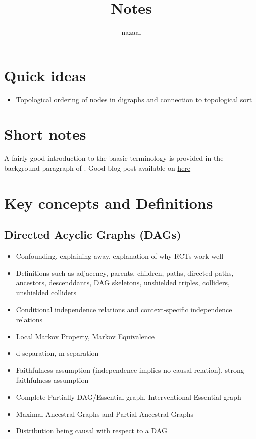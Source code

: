 \documentclass[11pt]{article}
\author{nazaal}
\date{}
\title{Notes}
\begin{document}
\maketitle


\section{Quick ideas}
\label{sec:org378d690}
\begin{itemize}
\item Topological ordering of nodes in digraphs and connection to topological sort
\end{itemize}


\section{Short notes}
\label{sec:orgd8a5a30}
A fairly good introduction to the baasic terminology is provided in the background paragraph of \cite{sondhi-2019-reduc-pc-algor}. Good blog post available on \href{https://ermongroup.github.io/cs228-notes/}{here}
\section{Key concepts and Definitions}
\label{sec:orge438781}
\subsection{Directed Acyclic Graphs (DAGs)}
\label{sec:orgad4359d}
\begin{itemize}
\item Confounding, explaining away, explanation of why RCTs work well
\item Definitions such as adjacency, parents, children, paths, directed paths, ancestors, descenddants, DAG skeletons, unshielded triples, colliders, unshielded colliders
\item Conditional independence relations and context-specific independence relations
\item Local Markov Property, Markov Equivalence
\item d-separation, m-separation
\item Faithfulness assumption (independence implies no causal relation), strong faithfulness assumption
\item Complete Partially DAG/Essential graph, Interventional Essential graph
\item Maximal Ancestral Graphs and Partial Ancestral Graphs
\item Distribution being causal with respect to a DAG
\end{itemize}
\end{document}
